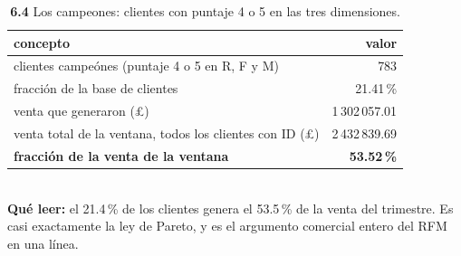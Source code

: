 \begin{table}[htbp]
\centering
\footnotesize
\caption{\textbf{6.4} Los campeones: clientes con puntaje 4 o 5 en las tres dimensiones.}
\label{tab:p6_campeones}
\begin{tabular}{lr}
\toprule
\textbf{concepto} & \textbf{valor} \\
\midrule
clientes campe\'ones (puntaje 4 o 5 en R, F y M) & 783 \\
fracci\'on de la base de clientes & 21.41\,\% \\
venta que generaron (\pounds) & 1\,302\,057.01 \\
venta total de la ventana, todos los clientes con ID (\pounds) & 2\,432\,839.69 \\
\textbf{fracci\'on de la venta de la ventana} & \textbf{53.52\,\%} \\
\bottomrule
\end{tabular}
\\[0.3em]{\scriptsize \textbf{Qu\'e leer:} el 21.4\,\% de los clientes genera el 53.5\,\% de la venta del trimestre. Es casi exactamente la ley de Pareto, y es el argumento comercial entero del RFM en una l\'inea.}
\end{table}
